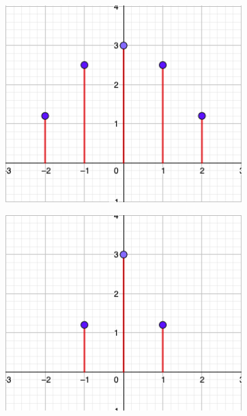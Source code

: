 \documentclass[a4paper]{book}
\begin{document}
\begin{figure}[!ht]
	\centering
	\caption{Señales discretas con cambios de escala}
	\begin{subfigure}[b]{0.4\textwidth}
		\includegraphics[width=\textwidth]{./Imágenes/aak.png}
	\end{subfigure}
	\hfill
	\begin{subfigure}[b]{0.4\textwidth}
		\includegraphics[width=\textwidth]{./Imágenes/aal.png}
	\end{subfigure}


\end{figure}
\end{document}

